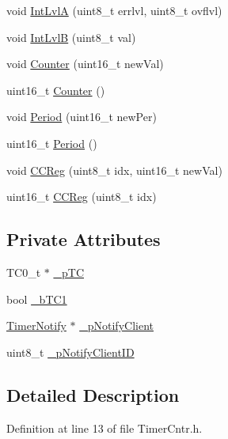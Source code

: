 \begin{DoxyCompactItemize}
void \hyperlink{class_timer_cntr_a3d9d3bca0c89f5dbc69b34406ef6c4be}{IntLvlA} (uint8\_\-t errlvl, uint8\_\-t ovflvl)
\item 
void \hyperlink{class_timer_cntr_a687162461b8b992093f3573356506a8c}{IntLvlB} (uint8\_\-t val)
\item 
void \hyperlink{class_timer_cntr_a483fd3e00603951991333699a1be67ea}{Counter} (uint16\_\-t newVal)
\item 
uint16\_\-t \hyperlink{class_timer_cntr_ae0b24888d24c907aad75ed985431f1a4}{Counter} ()
\item 
void \hyperlink{class_timer_cntr_a3f1c57b8f31a717b5de335cd56408029}{Period} (uint16\_\-t newPer)
\item 
uint16\_\-t \hyperlink{class_timer_cntr_a0b50451ff7454d77aff54ca3274c7b7c}{Period} ()
\item 
void \hyperlink{class_timer_cntr_aa4cead09b55956ef48dd19fcf7a2dea0}{CCReg} (uint8\_\-t idx, uint16\_\-t newVal)
\item 
uint16\_\-t \hyperlink{class_timer_cntr_a8cedc6015da8a1082273071d2eb7c68b}{CCReg} (uint8\_\-t idx)
\end{DoxyCompactItemize}
\subsection*{Private Attributes}
\begin{DoxyCompactItemize}
\item 
TC0\_\-t $\ast$ \hyperlink{class_timer_cntr_ae29c58d2e9059e5b3cff07a26dcc5b91}{\_\-pTC}
\item 
bool \hyperlink{class_timer_cntr_a568c634a1b85c88206408c5108500c7b}{\_\-bTC1}
\item 
\hyperlink{class_timer_notify}{TimerNotify} $\ast$ \hyperlink{class_timer_cntr_ab0667571f2dab6ca9f759d9b2c8ce59f}{\_\-pNotifyClient}
\item 
uint8\_\-t \hyperlink{class_timer_cntr_a98b954b9492a11842e511fa21d0131cc}{\_\-pNotifyClientID}
\end{DoxyCompactItemize}


\subsection{Detailed Description}


Definition at line 13 of file TimerCntr.h.



